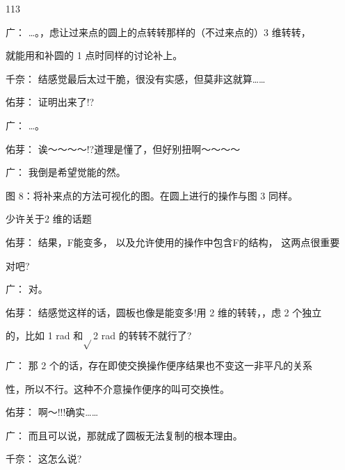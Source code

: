 113\par
广： …。，虑让过来点的圆上的点转转那样的（不过来点的）3 维转转，\par
就能用和补圆的 1 点时同样的讨论补上。\par
千奈： 结感觉最后太过干脆，很没有实感，但莫非这就算……\par
佑芽： 证明出来了!?\par
广： …。\par
佑芽： 诶～～～～!?道理是懂了，但好别扭啊～～～～\par
广： 我倒是希望觉能的然。\par
图 8：将补来点的方法可视化的图。在圆上进行的操作与图 3 同样。\par
少许关于2 维的话题\par
佑芽： 结果，F能变多， 以及允许使用的操作中包含F的结构， 这两点很重要\par
对吧?\par
广： 对。\par
佑芽： 结感觉这样的话，圆板也像是能变多!用 2 维的转转，，虑 2 个独立\par
的，比如 1 rad 和$\sqrt{}$2 rad 的转转不就行了?\par
广： 那 2 个的话，存在即使交换操作便序结果也不变这一非平凡的关系\par
性，所以不行。这种不介意操作便序的叫可交换性。\par
佑芽： 啊～!!!确实……\par
广： 而且可以说，那就成了圆板无法复制的根本理由。\par
千奈： 这怎么说?\par


